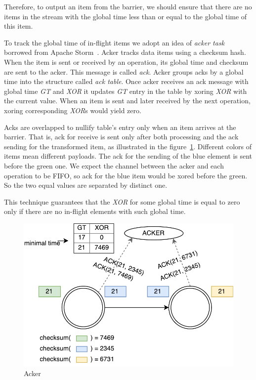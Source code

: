 Therefore, to output an item from the barrier, we should ensure that there are no items in the stream with the global time less than or equal to the global time of this item.

To track the global time of in-flight items we adopt an idea of {\it acker task} borrowed from Apache Storm~\cite{apache:storm}. Acker tracks data items using a checksum hash. When the item is sent or received by an operation, its global time and checksum are sent to the acker. This message is called {\it ack}. Acker groups acks by a global time into the structure called {\it ack table}. Once acker receives an ack message with global time {\it GT} and {\it XOR} it updates {\it GT} entry in the table by xoring {\it XOR} with the current value. When an item is sent and later received by the next operation, xoring corresponding {\it XOR}s would yield zero.

Acks are overlapped to nullify table's entry only when an item arrives at the barrier. That is, ack for receive is sent only after both processing and the ack sending for the transformed item, as illustrated in the figure~\ref{acker}. Different colors of items mean different payloads. The ack for the sending of the blue element is sent before the green one. We expect the channel between the acker and each operation to be FIFO, so ack for the blue item would be xored before the green. So the two equal values are separated by distinct one. 

This technique guarantees that the {\it XOR} for some global time is equal to zero only if there are no in-flight elements with such global time.

\begin{figure}[htbp]
  \centering
  \includegraphics[scale=0.5]{pics/acker}
  \caption{Acker}
  \label {acker}
\end{figure}

